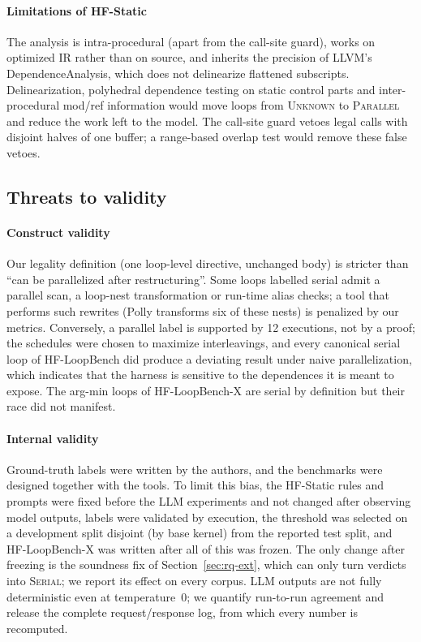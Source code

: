 \paragraph{Limitations of HF-Static} The analysis is intra-procedural (apart from the call-site guard), works on optimized IR rather than on source, and inherits the precision of LLVM's DependenceAnalysis, which does not delinearize flattened subscripts. Delinearization, polyhedral dependence testing on static control parts and inter-procedural mod/ref information would move loops from \textsc{Unknown} to \textsc{Parallel} and reduce the work left to the model. The call-site guard vetoes legal calls with disjoint halves of one buffer; a range-based overlap test would remove these false vetoes.

\subsection{Threats to validity}
\label{sec:threats}

\paragraph{Construct validity} Our legality definition (one loop-level directive, unchanged body) is stricter than ``can be parallelized after restructuring''. Some loops labelled serial admit a parallel scan, a loop-nest transformation or run-time alias checks; a tool that performs such rewrites (Polly transforms six of these nests) is penalized by our metrics. Conversely, a parallel label is supported by 12 executions, not by a proof; the schedules were chosen to maximize interleavings, and every canonical serial loop of HF-LoopBench did produce a deviating result under naive parallelization, which indicates that the harness is sensitive to the dependences it is meant to expose. The arg-min loops of HF-LoopBench-X are serial by definition but their race did not manifest.

\paragraph{Internal validity} Ground-truth labels were written by the authors, and the benchmarks were designed together with the tools. To limit this bias, the HF-Static rules and prompts were fixed before the LLM experiments and not changed after observing model outputs, labels were validated by execution, the threshold was selected on a development split disjoint (by base kernel) from the reported test split, and HF-LoopBench-X was written after all of this was frozen. The only change after freezing is the soundness fix of Section~\ref{sec:rq-ext}, which can only turn verdicts into \textsc{Serial}; we report its effect on every corpus. LLM outputs are not fully deterministic even at temperature~0; we quantify run-to-run agreement and release the complete request/response log, from which every number is recomputed.

